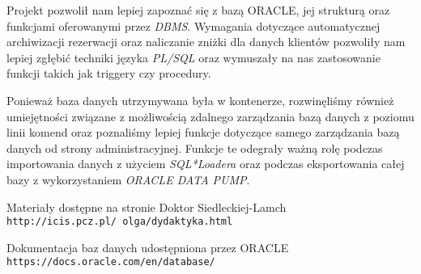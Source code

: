 \documentclass[a4paper]{article}
\begin{document}
Projekt pozwolił nam lepiej zapoznać się z bazą ORACLE, jej strukturą oraz funkcjami oferowanymi przez \textit{DBMS}. Wymagania dotyczące automatycznej archiwizacji rezerwacji oraz naliczanie zniżki dla danych klientów pozwoliły nam lepiej zgłębić techniki języka \textit{PL/SQL} oraz wymuszały na nas zastosowanie funkcji takich jak triggery czy procedury.

Ponieważ baza danych utrzymywana była w kontenerze, rozwinęliśmy również umiejętności związane z możliwością zdalnego zarządzania bazą danych z poziomu linii komend oraz poznaliśmy lepiej funkcje dotyczące samego zarządzania bazą danych od strony administracyjnej. Funkcje te odegrały ważną rolę podczas importowania danych z użyciem \textit{SQL*Loadera} oraz podczas eksportowania całej bazy z wykorzystaniem \textit{ORACLE DATA PUMP}.

\newpage

\begin{thebibliography}{9}

Materiały dostępne na stronie Doktor Siedleckiej-Lamch
\\\texttt{http://icis.pcz.pl/~olga/dydaktyka.html}

Dokumentacja baz danych udostępniona przez ORACLE
\\\texttt{https://docs.oracle.com/en/database/}
 
\end{thebibliography}
\end{document}
